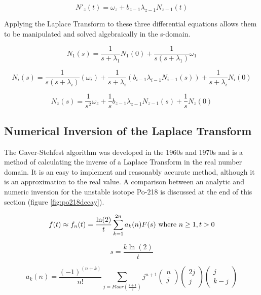 \begin{equation}
N'_{z}(t) =  \omega_{z} + b_{z-1} \lambda_{z-1} N_{z-1} (t)
\end{equation}

Applying the Laplace Transform to these three differential equations allows them to be manipulated and solved algebraically in the s-domain.

\begin{equation}
N_{1}(s) = \frac{1}{s+\lambda_{1}} N_{1}(0) + \frac{1}{s(s+\lambda_{1})} \omega_{1}
\end{equation}

\begin{equation}
N_{i}(s) = \frac{1}{s ( s+ \lambda_{i})} \left(\omega_{i} \right) + \frac{1}{s+ \lambda_{i}} \left( b_{i-1} \lambda_{i-1} N_{i-1} (s) \right) + \frac{1}{s+ \lambda_{i}} N_{i} (0)
\end{equation}

\begin{equation}
N_{z}(s) = \frac{1}{s^2} \omega_{z} + \frac{1}{s} b_{z-1} \lambda_{z-1} N_{z-1} (s) + \frac{1}{s} N_{z}(0)
\end{equation}


\subsection{Numerical Inversion of the Laplace Transform}

The Gaver-Stehfest\cite{stehfest} algorithm was developed in the 1960s and 1970s and is a method of calculating the inverse of a Laplace Transform in the real number domain.  It is an easy to implement and reasonably accurate method, although it is an approximation to the real value.  A comparison between an analytic and numeric inversion for the unstable isotope Po-218 is discussed at the end of this section (figure \ref{fig:po218decay}).

\begin{equation}
f(t) \approx f_{n}(t) = \frac{\ln(2)}{t} \sum_{k=1}^{2n} a_{k}(n)F(s) \textnormal{ where } n \ge 1, t>0
\end{equation}

\begin{equation}
s = \frac{k \ln(2)}{t}
\end{equation}

\begin{equation}
a_{k}(n) = \frac{(-1)^{(n+k)}}{n!} \sum_{j=Floor(\frac{k+1}{2})} j^{n+1} \left( \begin{matrix} n \\ j \end{matrix} \right)  \left( \begin{matrix} 2j \\ j \end{matrix} \right)  \left( \begin{matrix} j \\ k-j \end{matrix} \right)
\end{equation}

